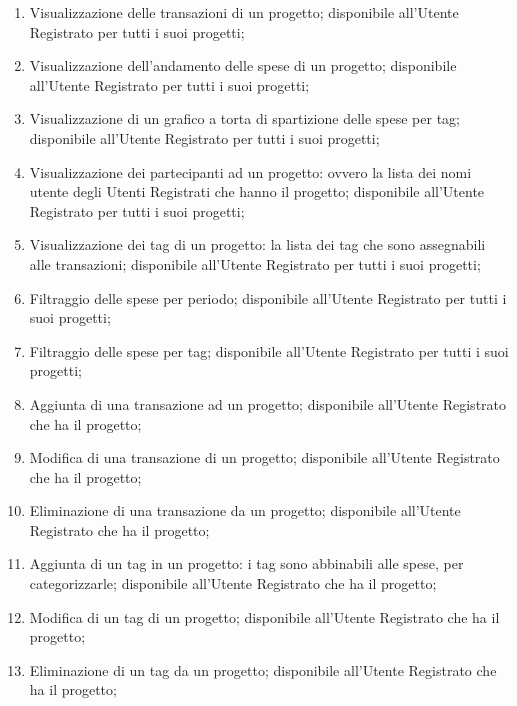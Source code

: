 \begin{enumerate}
    \item Visualizzazione delle transazioni di un progetto; disponibile
		all'Utente Registrato per tutti i suoi progetti;

    \item Visualizzazione dell'andamento delle spese di un progetto;
    disponibile all'Utente Registrato per tutti i suoi progetti;

    \item Visualizzazione di un grafico a torta di spartizione delle spese per
		tag;  disponibile all'Utente Registrato per tutti i suoi progetti;

    \item Visualizzazione dei partecipanti ad un progetto: ovvero la lista dei nomi utente degli Utenti Registrati che hanno il progetto;
    disponibile all'Utente Registrato per tutti i suoi progetti;

    \item Visualizzazione dei tag di un progetto: la lista dei tag che sono
		assegnabili alle transazioni; disponibile all'Utente Registrato per
		tutti i suoi progetti;

    \item Filtraggio delle spese per periodo; disponibile all'Utente Registrato
		per tutti i suoi progetti;

    \item Filtraggio delle spese per tag; disponibile all'Utente Registrato per
		tutti i suoi progetti;
     
    \item Aggiunta di una transazione ad un progetto; disponibile all'Utente Registrato che ha il progetto;

    \item Modifica di una transazione di un progetto; disponibile all'Utente Registrato che ha il progetto;

    \item Eliminazione di una transazione da un progetto; disponibile all'Utente Registrato che ha il progetto;

    \item Aggiunta di un tag in un progetto: i tag sono abbinabili alle spese, per categorizzarle; disponibile all'Utente Registrato che ha il progetto;

    \item Modifica di un tag di un progetto; disponibile all'Utente Registrato che ha il progetto;

    \item Eliminazione di un tag da un progetto; disponibile all'Utente Registrato che ha il progetto;
\end{enumerate}


